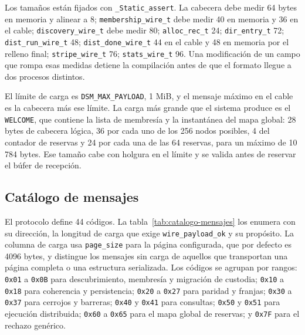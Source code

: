 Los tamaños están fijados con \texttt{\_Static\_assert}. La cabecera debe medir 64 bytes en memoria y alinear a 8; \texttt{membership\_wire\_t} debe medir 40 en memoria y 36 en el cable; \texttt{discovery\_wire\_t} debe medir 80; \texttt{alloc\_rec\_t} 24; \texttt{dir\_entry\_t} 72; \texttt{dist\_run\_wire\_t} 48; \texttt{dist\_done\_wire\_t} 44 en el cable y 48 en memoria por el relleno final; \texttt{stripe\_wire\_t} 76; \texttt{stats\_wire\_t} 96. Una modificación de un campo que rompa esas medidas detiene la compilación antes de que el formato llegue a dos procesos distintos.

El límite de carga es \texttt{DSM\_MAX\_PAYLOAD}, 1 MiB, y el mensaje máximo en el cable es la cabecera más ese límite. La carga más grande que el sistema produce es el \texttt{WELCOME}, que contiene la lista de membresía y la instantánea del mapa global: 28 bytes de cabecera lógica, 36 por cada uno de los 256 nodos posibles, 4 del contador de reservas y 24 por cada una de las 64 reservas, para un máximo de 10 784 bytes. Ese tamaño cabe con holgura en el límite y se valida antes de reservar el búfer de recepción.

\subsection{Catálogo de mensajes}

El protocolo define 44 códigos. La tabla~\ref{tab:catalogo-mensajes} los enumera con su dirección, la longitud de carga que exige \texttt{wire\_payload\_ok} y su propósito. La columna de carga usa \texttt{page\_size} para la página configurada, que por defecto es 4096 bytes, y distingue los mensajes sin carga de aquellos que transportan una página completa o una estructura serializada. Los códigos se agrupan por rangos: \texttt{0x01} a \texttt{0x0B} para descubrimiento, membresía y migración de custodia; \texttt{0x10} a \texttt{0x18} para coherencia y persistencia; \texttt{0x20} a \texttt{0x27} para paridad y franjas; \texttt{0x30} a \texttt{0x37} para cerrojos y barreras; \texttt{0x40} y \texttt{0x41} para consultas; \texttt{0x50} y \texttt{0x51} para ejecución distribuida; \texttt{0x60} a \texttt{0x65} para el mapa global de reservas; y \texttt{0x7F} para el rechazo genérico.

